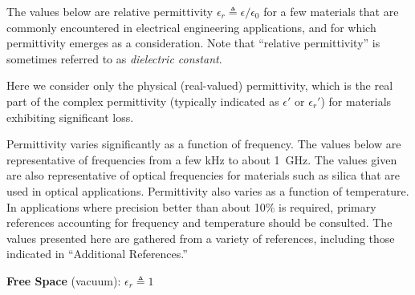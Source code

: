 

\label{m0135_Table_of_Permittivities} %

The values below are relative permittivity $\epsilon_r \triangleq \epsilon/\epsilon_0$ for a few materials that are commonly encountered in electrical engineering applications, and for which permittivity emerges as a consideration.
Note that ``relative permittivity'' 
is sometimes referred to as \emph{dielectric constant}.

Here we consider only the physical (real-valued) permittivity, which is the real part of the complex permittivity (typically indicated as $\epsilon'$ or $\epsilon_r'$) for materials exhibiting significant loss.

Permittivity varies significantly as a function of frequency.
The values below are representative of frequencies from a few kHz to about 1~GHz.
The values given are also representative of optical frequencies for materials such as silica that are used in optical applications.
Permittivity also varies as a function of temperature.
In applications where precision better than about 10\% is required, primary references accounting for frequency and temperature should be consulted.
The values presented here are gathered from a variety of references, including those indicated in ``Additional References.''
  
{\bf Free Space} (vacuum): $\epsilon_r \triangleq 1$

